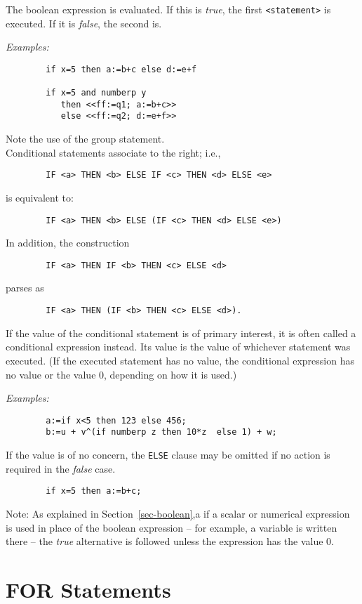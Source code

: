 \documentclass[11pt,letterpaper]{book}
\makeatletter
\newcommand{\underscore}{\_}
\newcommand{\ttindex}[1]{{\renewcommand{\_}{\protect\underscore}%
                          \index{#1@{\tt #1}}}}
\makeatother
\begin{document}
The boolean expression is evaluated. If this is {\em true}, the first
{\tt <statement>} is executed.  If it is {\em false}, the second is.

{\it Examples:}
{\small\begin{verbatim}
        if x=5 then a:=b+c else d:=e+f

        if x=5 and numberp y
           then <<ff:=q1; a:=b+c>>
           else <<ff:=q2; d:=e+f>>
\end{verbatim}}
Note the use of the group statement.
\\
Conditional statements associate to the right; i.e.,\ttindex{IF}
{\small\begin{verbatim}
        IF <a> THEN <b> ELSE IF <c> THEN <d> ELSE <e>
\end{verbatim}}
is equivalent to:
{\small\begin{verbatim}
        IF <a> THEN <b> ELSE (IF <c> THEN <d> ELSE <e>)
\end{verbatim}}
In addition, the construction
{\small\begin{verbatim}
        IF <a> THEN IF <b> THEN <c> ELSE <d>
\end{verbatim}}
parses as
{\small\begin{verbatim}
        IF <a> THEN (IF <b> THEN <c> ELSE <d>).
\end{verbatim}}
If the value of the conditional statement is of primary interest, it is often called a conditional
expression instead.  Its value is the value of whichever statement was
executed. (If the executed statement has no value, the conditional
expression has no value or the value 0, depending on how it is used.)

{\it Examples:}
{\small\begin{verbatim}
        a:=if x<5 then 123 else 456;
        b:=u + v^(if numberp z then 10*z  else 1) + w;
\end{verbatim}}
If the value is of no concern, the {\tt ELSE} clause may be omitted if no
action is required in the {\em false\/} case.
{\small\begin{verbatim}
        if x=5 then a:=b+c;
\end{verbatim}}
Note:  As explained in Section~\ref{sec-boolean},a
if a scalar or numerical expression is used in place of
the boolean expression -- for example, a variable is written there -- the
{\em true\/} alternative is followed unless the expression has the value 0.

\section{FOR Statements}
\end{document}
